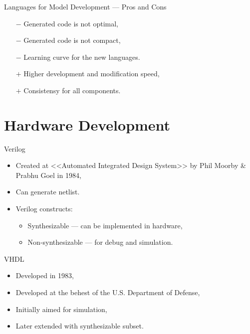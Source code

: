 \begin{frame}{Languages for Model Development --- Pros and Cons}
  \begin{itemize}
    \item[$-$] Generated code is not optimal,
    \item[$-$] Generated code is not compact,
    \item[$-$] Learning curve for the new languages.
    \item[$+$] Higher development and modification speed,
    \item[$+$] Consistensy for all components.
  \end{itemize}
\end{frame}

\section{Hardware Development}


\begin{frame}{Verilog}
  \begin{itemize}
    \item Created at <<Automated Integrated Design System>> by Phil Moorby \&
      Prabhu Goel in 1984,
    \item Can generate netlist.
    \item Verilog constructs:
    \begin{itemize}
      \item Synthesizable --- can be implemented in hardware,
      \item Non-synthesizable --- for debug and simulation.
    \end{itemize}
  \end{itemize}
\end{frame}



\begin{frame}{VHDL}
  \begin{itemize}
    \item Developed in 1983,
    \item Developed at the behest of the U.S. Department of Defense,
    \item Initially aimed for simulation,
    \item Later extended with synthesizable subset.
  \end{itemize}
\end{frame}

